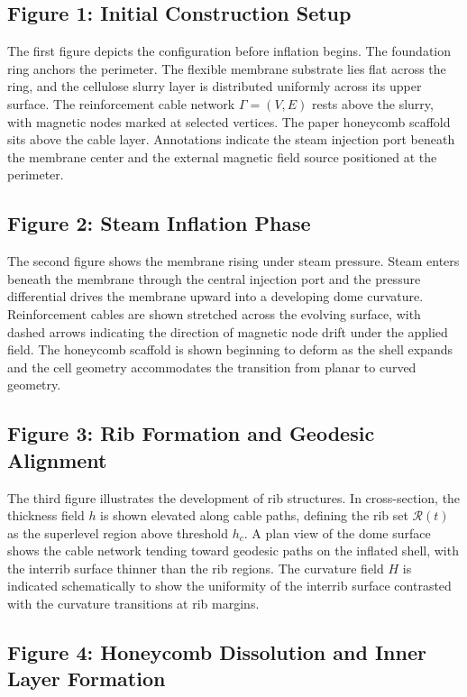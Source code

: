 \documentclass[12pt,a4paper]{article}
\begin{document}
\subsection{Figure 1: Initial Construction Setup}

The first figure depicts the configuration before inflation begins. The
foundation ring anchors the perimeter. The flexible membrane substrate
lies flat across the ring, and the cellulose slurry layer is distributed
uniformly across its upper surface. The reinforcement cable network
$\Gamma = (V,E)$ rests above the slurry, with magnetic nodes marked at
selected vertices. The paper honeycomb scaffold sits above the cable
layer. Annotations indicate the steam injection port beneath the
membrane center and the external magnetic field source positioned at
the perimeter.

\subsection{Figure 2: Steam Inflation Phase}

The second figure shows the membrane rising under steam pressure. Steam
enters beneath the membrane through the central injection port and the
pressure differential drives the membrane upward into a developing dome
curvature. Reinforcement cables are shown stretched across the evolving
surface, with dashed arrows indicating the direction of magnetic node
drift under the applied field. The honeycomb scaffold is shown beginning
to deform as the shell expands and the cell geometry accommodates the
transition from planar to curved geometry.

\subsection{Figure 3: Rib Formation and Geodesic Alignment}

The third figure illustrates the development of rib structures. In
cross-section, the thickness field $h$ is shown elevated along cable
paths, defining the rib set $\mathcal{R}(t)$ as the superlevel region
above threshold $h_c$. A plan view of the dome surface shows the cable
network tending toward geodesic paths on the inflated shell, with the
interrib surface thinner than the rib regions. The curvature field $H$
is indicated schematically to show the uniformity of the interrib
surface contrasted with the curvature transitions at rib margins.

\subsection{Figure 4: Honeycomb Dissolution and Inner Layer Formation}
\end{document}
